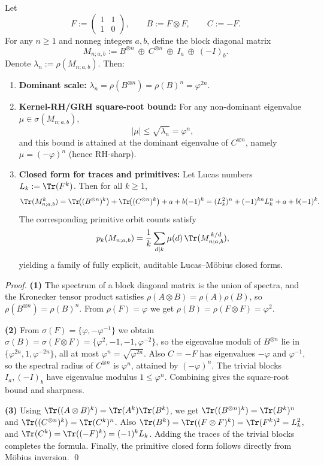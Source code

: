 \begin{theorem}\label{thm:fib-tensor-rhsharp-closure}
Let
\[
F:=\begin{pmatrix}1&1\\[2pt]1&0\end{pmatrix},\qquad
B:=F\otimes F,\qquad
C:=-F.
\]
For any $n\ge 1$ and nonneg integers $a,b$, define the block diagonal matrix
\[
M_{n;a,b}:=B^{\otimes n}\ \oplus\ C^{\otimes n}\ \oplus\ I_a\ \oplus\ (-I)_b.
\]
Denote
\(
\lambda_n:=\rho(M_{n;a,b})
\).
Then:
\begin{enumerate}
  \item \textbf{Dominant scale:} $\lambda_n=\rho(B^{\otimes n})=\rho(B)^n=\varphi^{2n}$.
  \item \textbf{Kernel-RH/GRH square-root bound:} For any non-dominant eigenvalue $\mu\in\sigma(M_{n;a,b})$,
  \[
  |\mu|\le \sqrt{\lambda_n}=\varphi^{n},
  \]
  and this bound is attained at the dominant eigenvalue of $C^{\otimes n}$, namely $\mu=(-\varphi)^n$ (hence RH-sharp).
  \item \textbf{Closed form for traces and primitives:} Let Lucas numbers $L_k:=\Tr(F^k)$. Then for all $k\ge 1$,
  \[
  \Tr(M_{n;a,b}^k)
  =
  \Tr\!\bigl((B^{\otimes n})^k\bigr)+\Tr\!\bigl((C^{\otimes n})^k\bigr)+a+b(-1)^k
  =
  (L_k^2)^{n}+(-1)^{kn}L_k^{n}+a+b(-1)^k.
  \]
  The corresponding primitive orbit counts satisfy
  \[
  p_k(M_{n;a,b})=\frac{1}{k}\sum_{d\mid k}\mu(d)\,\Tr(M_{n;a,b}^{\,k/d}),
  \]
  yielding a family of fully explicit, auditable Lucas--M\"obius closed forms.
\end{enumerate}
\end{theorem}
\begin{proof}
\textbf{(1)} The spectrum of a block diagonal matrix is the union of spectra, and the Kronecker tensor product satisfies $\rho(A\otimes B)=\rho(A)\rho(B)$, so $\rho(B^{\otimes n})=\rho(B)^n$. From $\rho(F)=\varphi$ we get $\rho(B)=\rho(F\otimes F)=\varphi^2$.

\textbf{(2)} From $\sigma(F)=\{\varphi,-\varphi^{-1}\}$ we obtain
\(
\sigma(B)=\sigma(F\otimes F)=\{\varphi^2,-1,-1,\varphi^{-2}\}
\),
so the eigenvalue moduli of $B^{\otimes n}$ lie in $\{\varphi^{2n},1,\varphi^{-2n}\}$, all at most $\varphi^{n}=\sqrt{\varphi^{2n}}$.
Also $C=-F$ has eigenvalues $-\varphi$ and $\varphi^{-1}$, so the spectral radius of $C^{\otimes n}$ is $\varphi^{n}$, attained by $(-\varphi)^n$. The trivial blocks $I_a,(-I)_b$ have eigenvalue modulus $1\le \varphi^{n}$. Combining gives the square-root bound and sharpness.

\textbf{(3)} Using $\Tr((A\otimes B)^k)=\Tr(A^k)\Tr(B^k)$, we get $\Tr((B^{\otimes n})^k)=\Tr(B^k)^n$ and $\Tr((C^{\otimes n})^k)=\Tr(C^k)^n$.
Also $\Tr(B^k)=\Tr((F\otimes F)^k)=\Tr(F^k)^2=L_k^2$, and $\Tr(C^k)=\Tr((-F)^k)=(-1)^k L_k$. Adding the traces of the trivial blocks completes the formula.
Finally, the primitive closed form follows directly from M\"obius inversion. \qed
\end{proof}

